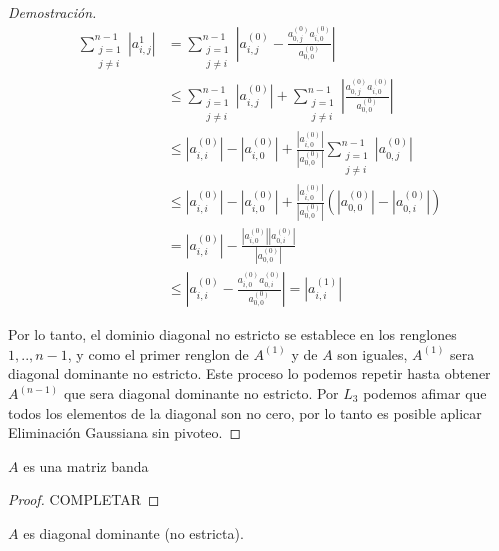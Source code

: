 \begin{proof}[Demostración]
\begin{equation*}
    \begin{aligned}
      \sum\limits_{\substack{j=1  \\ j \neq i}}^{n-1} |a^{1}_{i,j}| &= \sum\limits_{\substack{j=1  \\ j \neq i}}^{n-1} |a^{(0)}_{i,j} - \frac{a^{(0)}_{0,j}a^{(0)}_{i,0}}{a^{(0)}_{0,0}}| \\
      &\leq \sum\limits_{\substack{j=1  \\ j \neq i}}^{n-1} |a^{(0)}_{i,j}| + \sum\limits_{\substack{j=1  \\ j \neq i}}^{n-1} |\frac{a^{(0)}_{0,j}a^{(0)}_{i,0}}{a^{(0)}_{0,0}}| \\
      &\leq |a^{(0)}_{i,i}| - |a^{(0)}_{i,0}| +  \frac{|a^{(0)}_{i,0}|}{|a^{(0)}_{0,0}|} \sum\limits_{\substack{j=1  \\ j \neq i}}^{n-1} |a^{(0)}_{0,j}| \\
      &\leq |a^{(0)}_{i,i}| - |a^{(0)}_{i,0}| +  \frac{|a^{(0)}_{i,0}|}{|a^{(0)}_{0,0}|} (|a^{(0)}_{0,0}| - |a^{(0)}_{0,i}|) \\
      &= |a^{(0)}_{i,i}| - \frac{|a^{(0)}_{i,0}||a^{(0)}_{0,i}|}{|a^{(0)}_{0,0}|} \\
      &\leq |a^{(0)}_{i,i} - \frac{a^{(0)}_{i,0}a^{(0)}_{0,i}}{a^{(0)}_{0,0}}| = |a^{(1)}_{i,i}|
    \end{aligned}
\end{equation*}

Por lo tanto, el dominio diagonal no estricto se establece en los renglones $1,..,n-1$, y como el primer renglon de $A^{(1)}$ y de $A$ son iguales, $A^{(1)}$ sera diagonal dominante no estricto.
\newline
Este proceso lo podemos repetir hasta obtener $A^{(n-1)}$ que sera diagonal dominante no estricto. Por $L_{3}$ podemos afimar que todos los elementos de la diagonal son no cero, por lo tanto es posible aplicar Eliminación Gaussiana sin pivoteo.
\end{proof}
  \begin{lemma}
    $A$ es una matriz banda
  \end{lemma}

  \begin{proof}
    COMPLETAR
  \end{proof}

  \begin{lemma}
    $A$ es diagonal dominante (no estricta).
  \end{lemma}

